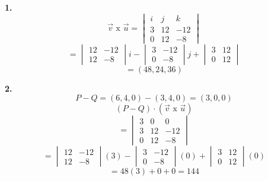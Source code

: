 \documentclass{article}
\begin{document}
\begin{enumerate}
\begin{itemize}
        \hspace*{-3cm}\begin{minipage}[c]{0.5cm}
            \textbf{1.}
            $$\vec{v}\text{ x } \vec{u} = \begin{vmatrix}
                i & j & k \\
                3 & 12 & -12 \\
                0 & 12 & -8
            \end{vmatrix}$$
            $$= \begin{vmatrix}
                12 & -12 \\
                12 & -8
            \end{vmatrix}i- \begin{vmatrix}
                3 & -12 \\
                0 & -8 
            \end{vmatrix}j+ \begin{vmatrix}
                3 & 12 \\
                0 & 12
            \end{vmatrix}$$
            $$=(48, 24, 36)$$
        \end{minipage}\hspace*{6.5cm}\begin{minipage}[c]{0.5cm}
            \textbf{2.}
            $$P -Q =(6,4,0)- (3,4,0) = (3, 0, 0)$$
            $$ (P-Q) \cdot (\vec{v} \text{ x } \vec{u})$$
            $$= \begin{vmatrix}
                3 & 0 & 0 \\
                3 & 12 & -12 \\
                0 & 12 & -8
            \end{vmatrix}$$
            $$= \begin{vmatrix}
                12 & -12 \\
                12 & -8
            \end{vmatrix}(3)- \begin{vmatrix}
                3 & -12 \\
                0 & -8 
            \end{vmatrix}(0)+ \begin{vmatrix}
                3 & 12 \\
                0 & 12
            \end{vmatrix}(0)$$
            $$= 48(3)+0+0 = 144$$
        \end{minipage}



\end{itemize}
\end{enumerate}
\end{document}
